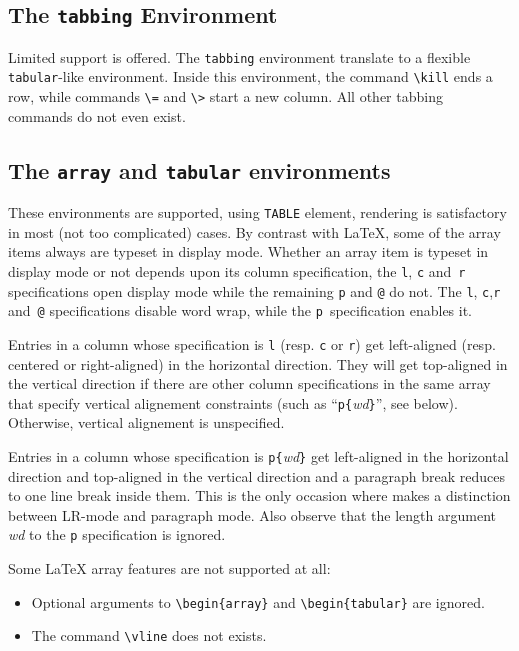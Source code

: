 \subsection{The \protect\texttt{tabbing} Environment}
Limited support is offered.
The \texttt{tabbing} environment translate to a flexible \texttt{tabular}-like
environment.
Inside this environment, the command \verb+\kill+ ends a row, while
commands
\verb+\=+ and \verb+\>+ start a new column.
All other tabbing commands do not even exist.

\subsection{The \texttt{array} and \texttt{tabular}
environments}\label{arraydef}

These environments are supported, using \html{}
\verb+TABLE+ element, rendering is satisfactory in most (not too
complicated) cases.
By contrast with \LaTeX{},
some of the array items always are typeset in display mode.
Whether an array item is typeset in display mode or not depends upon
its column specification,
the \verb+l+, \verb+c+ and~\verb+r+ specifications open display mode
while the remaining \verb+p+ and \verb+@+ do not.
The \verb+l+, \verb+c+,\verb+r+ and~\verb+@+ specifications
disable word wrap, while the \verb+p+~specification enables it.

Entries in a column whose specification is \verb+l+ (resp. \verb+c+ or
\verb+r+) get left-aligned (resp. centered or right-aligned)
in the horizontal direction.
They will get top-aligned in the vertical direction if there are
other column specifications in the
same array that specify vertical alignement constraints
(such as ``\verb+p{+\textit{wd}\verb+}+'', see below).
Otherwise, vertical alignement is unspecified.

Entries in a column whose specification is \verb+p{+{\it wd}\verb+}+
get left-aligned in the horizontal direction and
top-aligned in the vertical direction
and a paragraph break reduces to one line break inside them.
This is the only occasion where
\hevea{} makes a distinction between LR-mode and paragraph mode.
Also observe that the length argument \textit{wd} to the \verb+p+
specification is ignored.


Some \LaTeX{} array features are not supported at all:
\begin{itemize}
\item Optional arguments to \verb+\begin{array}+ and
\verb+\begin{tabular}+ are ignored.
\item The command \verb+\vline+ does not exists.
\end{itemize}

